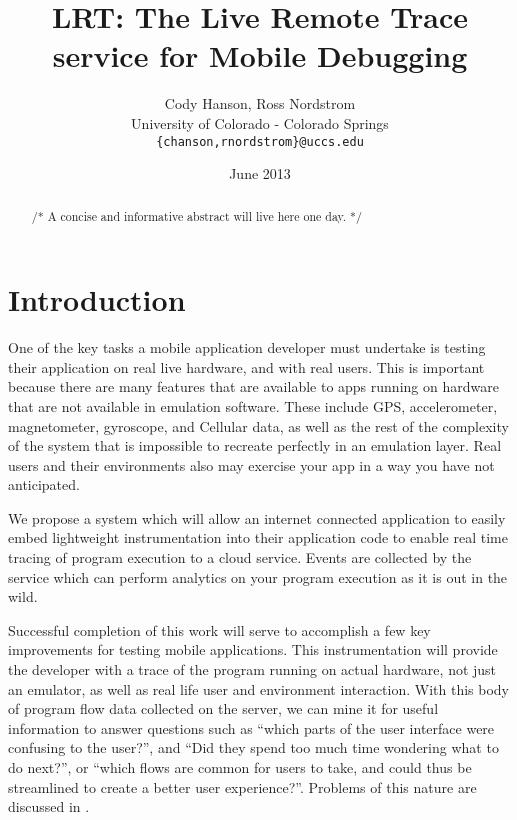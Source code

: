 \documentclass[11pt]{article}
\begin{document}
\title{LRT: The Live Remote Trace service for Mobile Debugging}
\author{Cody Hanson, Ross Nordstrom\\
        University of Colorado - Colorado Springs\\
        \texttt{\{chanson,rnordstrom\}@uccs.edu}
       }
\date{June 2013}

\maketitle

\begin{abstract}
/* A concise and informative abstract will live here one day. */

\end{abstract}

\section{Introduction}
One of the key tasks a mobile application developer must undertake is testing 
their application on real live hardware, and with real users. This is important 
because there are many features that are available to apps running on hardware 
that are not available in emulation software. These include GPS, accelerometer, 
magnetometer, gyroscope, and Cellular data, as well as the rest of the 
complexity of the system that is impossible to recreate perfectly in an 
emulation layer. Real users and their environments also may exercise your app in
a way you have not anticipated. 

We propose a system which will allow an internet connected application to easily
embed lightweight instrumentation into their application code to enable real 
time tracing of program execution to a cloud service. Events are collected by 
the service which can perform analytics on your program execution as it is out 
in the wild.

Successful completion of this work will serve to accomplish a few key 
improvements for testing mobile applications. This instrumentation will provide 
the developer with a trace of the program running on actual hardware, not just 
an emulator, as well as real life user and environment interaction. With this 
body of program flow data collected on the server, we can mine it for useful 
information to answer questions such as “which parts of the user interface were 
confusing to the user?”, and “Did they spend too much time wondering what to do 
next?”, or “which flows are common for users to take, and could thus be 
streamlined to create a better user experience?”. Problems of this nature are 
discussed in \cite{WebAntiPattern}.
\end{document}
